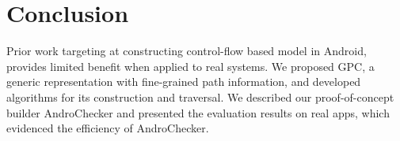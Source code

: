  


  

\section{Conclusion}
Prior work targeting at constructing control-flow based model in Android, provides limited benefit when applied to real systems. %
We proposed GPC, a generic representation with fine-grained path information, and developed algorithms for its construction and traversal. We described our proof-of-concept builder AndroChecker and presented the evaluation results on real apps, which evidenced the efficiency of AndroChecker. %



